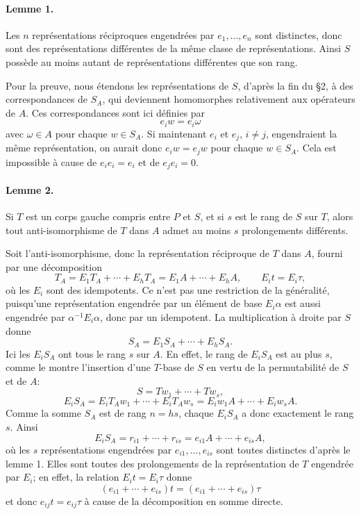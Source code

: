 \paragraph{Lemme 1.}
Les \(n\) représentations réciproques engendrées par \(e_1,\ldots,e_n\) sont distinctes, donc sont des représentations différentes de la même classe de représentations. Ainsi \(S\) possède au moins autant de représentations différentes que son rang.

Pour la preuve, nous étendons les représentations de \(S\), d'après la fin du \S 2, à des correspondances de \(S_A\), qui deviennent homomorphes relativement aux opérateurs de \(A\). Ces correspondances sont ici définies par
\[
        e_i w=e_i\omega
\]
avec \(\omega\in A\) pour chaque \(w\in S_A\). Si maintenant \(e_i\) et \(e_j\), \(i\ne j\), engendraient la même représentation, on aurait donc \(e_iw=e_jw\) pour chaque \(w\in S_A\). Cela est impossible à cause de \(e_ie_i=e_i\) et de \(e_je_i=0\).

\paragraph{Lemme 2.}
Si \(T\) est un corps gauche compris entre \(P\) et \(S\), et si \(s\) est le rang de \(S\) sur \(T\), alors tout anti-isomorphisme de \(T\) dans \(A\) admet au moins \(s\) prolongements différents.

Soit l'anti-isomorphisme, donc la représentation réciproque de \(T\) dans \(A\), fourni par une décomposition
\[
        T_A=E_1T_A+\cdots+E_hT_A
            =E_1A+\cdots+E_hA,
        \qquad E_it=E_i\tau ,
\]
où les \(E_i\) sont des idempotents. Ce n'est pas une restriction de la généralité, puisqu'une représentation engendrée par un élément de base \(E_i\alpha\) est aussi engendrée par \(\alpha^{-1}E_i\alpha\), donc par un idempotent. La multiplication à droite par \(S\) donne
\[
        S_A=E_1S_A+\cdots+E_hS_A .
\]
Ici les \(E_iS_A\) ont tous le rang \(s\) sur \(A\). En effet, le rang de \(E_iS_A\) est au plus \(s\), comme le montre l'insertion d'une \(T\)-base de \(S\) en vertu de la permutabilité de \(S\) et de \(A\):
\[
        S=Tw_1+\cdots+Tw_s,
\]
\[
        E_iS_A=E_iT_Aw_1+\cdots+E_iT_Aw_s
              =E_iw_1A+\cdots+E_iw_sA .
\]
Comme la somme \(S_A\) est de rang \(n=hs\), chaque \(E_iS_A\) a donc exactement le rang \(s\). Ainsi
\[
        E_iS_A=r_{i1}+\cdots+r_{is}
              =e_{i1}A+\cdots+e_{is}A,
\]
où les \(s\) représentations engendrées par \(e_{i1},\ldots,e_{is}\) sont toutes distinctes d'après le lemme 1. Elles sont toutes des prolongements de la représentation de \(T\) engendrée par \(E_i\); en effet, la relation \(E_it=E_i\tau\) donne
\[
        (e_{i1}+\cdots+e_{is})t=(e_{i1}+\cdots+e_{is})\tau
\]
et donc \(e_{ij}t=e_{ij}\tau\) à cause de la décomposition en somme directe.

